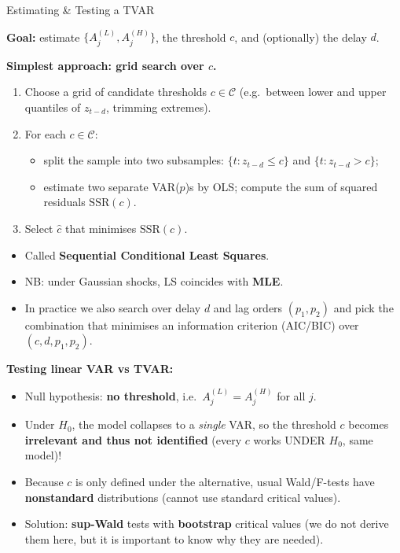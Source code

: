 \documentclass{beamer}
\begin{document}
\begin{frame}{Estimating \& Testing a TVAR}
\scriptsize

\textbf{Goal:} estimate $\{A_j^{(L)}, A_j^{(H)}\}$, the threshold $c$, and (optionally) the delay $d$.

\medskip
\textbf{Simplest approach: grid search over $c$.}
\begin{enumerate}
  \item Choose a grid of candidate thresholds $c \in \mathcal{C}$
        (e.g.\ between lower and upper quantiles of $z_{t-d}$, trimming extremes).
  \item For each $c \in \mathcal{C}$:
        \begin{itemize}
        \scriptsize
          \item split the sample into two subsamples:
                $\{t : z_{t-d} \le c\}$ and $\{t : z_{t-d} > c\}$;
          \item estimate two separate VAR($p$)s by OLS; compute the sum of squared residuals
                $\text{SSR}(c)$.
        \end{itemize}
  \item Select $\hat{c}$ that minimises $\text{SSR}(c)$.
\end{enumerate}

\begin{itemize}
  \item Called \textbf{Sequential Conditional Least Squares}. 
\item NB: under Gaussian shocks, LS coincides with \textbf{MLE}.
  \item In practice we also search over delay $d$ and lag orders $(p_1,p_2)$ and pick the combination that minimises an information criterion (AIC/BIC) over $(c,d,p_1,p_2)$.
\end{itemize}

\medskip
\textbf{Testing linear VAR vs TVAR:}
\begin{itemize}
  \item Null hypothesis: \textbf{no threshold}, i.e.\ $A_j^{(L)} = A_j^{(H)}$ for all $j$.
  \item Under $H_0$, the model collapses to a \emph{single} VAR, so the threshold
        $c$ becomes \textbf{irrelevant and thus not identified} (every $c$ works UNDER $H_0$, same model)! 
        \item Because $c$ is only defined under the alternative, usual Wald/F-tests
        have \textbf{nonstandard} distributions (cannot use standard critical values).
  \item Solution: \textbf{sup-Wald} tests with \textbf{bootstrap} critical values
        (we do not derive them here, but it is important to know why they are needed).
\end{itemize}

\end{frame}
\end{document}
